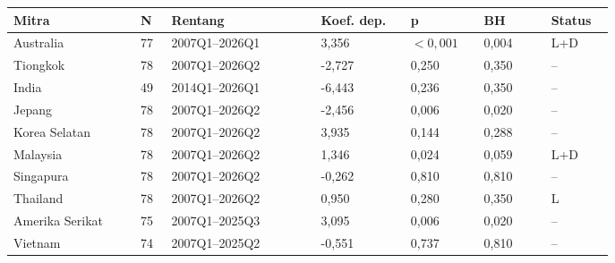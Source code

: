{\small\setlength{\tabcolsep}{3pt}\renewcommand{\arraystretch}{1.15}
\begin{tabular}{p{0.17\linewidth}p{0.045\linewidth}p{0.2\linewidth}p{0.12\linewidth}p{0.09\linewidth}p{0.09\linewidth}p{0.07\linewidth}}
\toprule
\textbf{Mitra} & \textbf{N} & \textbf{Rentang} & \textbf{Koef. dep.} & \textbf{p} & \textbf{BH} & \textbf{Status}\\
\midrule
Australia & 77 & 2007Q1--2026Q1 & 3,356 & \(<0{,}001\) & 0,004 & L+D\\
Tiongkok & 78 & 2007Q1--2026Q2 & -2,727 & 0,250 & 0,350 & --\\
India & 49 & 2014Q1--2026Q1 & -6,443 & 0,236 & 0,350 & --\\
Jepang & 78 & 2007Q1--2026Q2 & -2,456 & 0,006 & 0,020 & --\\
Korea Selatan & 78 & 2007Q1--2026Q2 & 3,935 & 0,144 & 0,288 & --\\
Malaysia & 78 & 2007Q1--2026Q2 & 1,346 & 0,024 & 0,059 & L+D\\
Singapura & 78 & 2007Q1--2026Q2 & -0,262 & 0,810 & 0,810 & --\\
Thailand & 78 & 2007Q1--2026Q2 & 0,950 & 0,280 & 0,350 & L\\
Amerika Serikat & 75 & 2007Q1--2025Q3 & 3,095 & 0,006 & 0,020 & --\\
Vietnam & 74 & 2007Q1--2025Q2 & -0,551 & 0,737 & 0,810 & --\\
\bottomrule
\end{tabular}
}